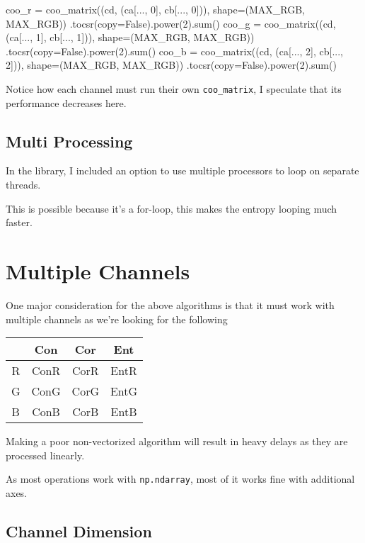 \documentclass[article,oneside]{memoir}
\begin{document}
\begin{python}
    
coo_r = coo_matrix((cd, (ca[..., 0], cb[..., 0])),
                    shape=(MAX_RGB, MAX_RGB))
                    .tocsr(copy=False).power(2).sum()
coo_g = coo_matrix((cd, (ca[..., 1], cb[..., 1])),
                    shape=(MAX_RGB, MAX_RGB))
                    .tocsr(copy=False).power(2).sum()
coo_b = coo_matrix((cd, (ca[..., 2], cb[..., 2])),
                    shape=(MAX_RGB, MAX_RGB))
                    .tocsr(copy=False).power(2).sum()
    
\end{python}

Notice how each channel must run their own \verb+coo_matrix+, I speculate that its performance decreases here.

\subsection{Multi Processing}

In the library, I included an option to use multiple processors to loop on separate threads.

This is possible because it's a for-loop, this makes the entropy looping much faster.

\section{Multiple Channels}

One major consideration for the above algorithms is that it must work with multiple channels as we're looking for the following 

\begin{center}
\begin{tabular}{ |c|c|c|c| } 
 \hline   & Con  & Cor  & Ent  \\ 
 \hline R & ConR & CorR & EntR \\
 \hline G & ConG & CorG & EntG \\
 \hline B & ConB & CorB & EntB \\
 \hline
\end{tabular}
\end{center} 

Making a poor non-vectorized algorithm will result in heavy delays as they are processed linearly.

As most operations work with \verb+np.ndarray+, most of it works fine with additional axes.

\subsection{Channel Dimension}
\end{document}
